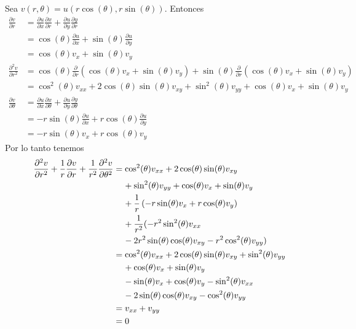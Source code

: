 \documentclass[11pt]{book}
\theoremstyle{plain}
\theoremstyle{definition}
\begin{document}
    Sea $v(r,\theta) = u(r\cos(\theta), r\sin(\theta))$. Entonces
    \begin{align*}
        \frac{\partial v}{\partial r} &= \frac{\partial u}{\partial x}\frac{\partial x}{\partial r} + \frac{\partial u}{\partial y}\frac{\partial y}{\partial r}\\
        &= \cos(\theta)\frac{\partial u}{\partial x} + \sin(\theta)\frac{\partial u}{\partial y}\\
        &= \cos(\theta)v_{x} + \sin(\theta)v_{y}\\
        \frac{\partial^{2} v}{\partial r^{2}} &= \cos(\theta)\frac{\partial}{\partial r}\left(\cos(\theta)v_{x} + \sin(\theta)v_{y}\right) + \sin(\theta)\frac{\partial}{\partial r}\left(\cos(\theta)v_{x} + \sin(\theta)v_{y}\right)\\
        &= \cos^{2}(\theta)v_{xx} + 2\cos(\theta)\sin(\theta)v_{xy} + \sin^{2}(\theta)v_{yy} + \cos(\theta)v_{x} + \sin(\theta)v_{y}\\
        \frac{\partial v}{\partial \theta} &= \frac{\partial u}{\partial x}\frac{\partial x}{\partial \theta} + \frac{\partial u}{\partial y}\frac{\partial y}{\partial \theta}\\
        &= -r\sin(\theta)\frac{\partial u}{\partial x} + r\cos(\theta)\frac{\partial u}{\partial y}\\
        &= -r\sin(\theta)v_{x} + r\cos(\theta)v_{y}
    \end{align*}
    Por lo tanto tenemos
    \begin{align*}
        \frac{\partial^{2} v}{\partial r^{2}} + \frac{1}{r}\frac{\partial v}{\partial r} + \frac{1}{r^{2}}\frac{\partial^{2} v}{\partial \theta^{2}} &= \cos^{2}(\theta)v_{xx} + 2\cos(\theta)\sin(\theta)v_{xy}\\
        &\hspace{4mm}+ \sin^{2}(\theta)v_{yy} + \cos(\theta)v_{x} + \sin(\theta)v_{y}\\
        &\hspace{4mm}+ \frac{1}{r}\left(-r\sin(\theta)v_{x} + r\cos(\theta)v_{y}\right)\\
        &\hspace{4mm}+ \frac{1}{r^{2}}(-r^{2}\sin^{2}(\theta)v_{xx}\\ 
        &\hspace{4mm}- 2r^{2}\sin(\theta)\cos(\theta)v_{xy} - r^{2}\cos^{2}(\theta)v_{yy})\\
        &= \cos^{2}(\theta)v_{xx} + 2\cos(\theta)\sin(\theta)v_{xy} + \sin^{2}(\theta)v_{yy}\\
        &\hspace{4mm}+ \cos(\theta)v_{x} + \sin(\theta)v_{y}\\
        &\hspace{4mm}- \sin(\theta)v_{x} + \cos(\theta)v_{y} - \sin^{2}(\theta)v_{xx}\\
        &\hspace{4mm}- 2\sin(\theta)\cos(\theta)v_{xy} - \cos^{2}(\theta)v_{yy}\\
        &= v_{xx} + v_{yy}\\
        &= 0
    \end{align*}
\end{document}

